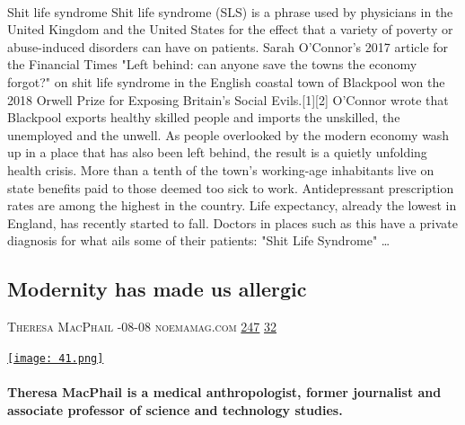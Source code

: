\documentclass[10pt,a4paper]{article}
\begin{document}
\begin{multicols}{2}
\paragraph{}
Shit life syndrome
Shit life syndrome (SLS) is a phrase used by physicians in the United Kingdom and the United States for the effect that a variety of poverty or abuse-induced disorders can have on patients.
Sarah O'Connor's 2017 article for the Financial Times "Left behind: can anyone save the towns the economy forgot?" on shit life syndrome in the English coastal town of Blackpool won the 2018 Orwell Prize for Exposing Britain's Social Evils.[1][2] O'Connor wrote that
Blackpool exports healthy skilled people and imports the unskilled, the unemployed and the unwell. As people overlooked by the modern economy wash up in a place that has also been left behind, the result is a quietly unfolding health crisis. More than a tenth of the town's working-age inhabitants live on state benefits paid to those deemed too sick to work. Antidepressant prescription rates are among the highest in the country. Life expectancy, already the lowest in England, has recently started to fall. Doctors in places such as this have a private diagnosis for what ails some of their patients: "Shit Life Syndrome"
\dots\par
\noindent\begin{minipage}{\linewidth}
\medskip
\subsection{Modernity has made us allergic}
\textsc{\footnotesize
{\scriptsize\faUser}\space 
Theresa MacPhail 
{\scriptsize\faCalendar}-08-08 
{\scriptsize\faGlobe}\space 
noemamag.com 
{\scriptsize\faThumbsOUp}\space 
\href{http://news.ycombinator.com/item?id=37195905\&utm\_term=comment}{247} 
{\scriptsize\faComments}\space 
\href{http://news.ycombinator.com/item?id=37195905\&utm\_term=comment}{32} 
}
\par\medskip\noindent
\href{https://www.noemamag.com/modernity-has-made-us-allergic/?utm\_source=hackernewsletter\&utm\_medium=email\&utm\_term=learn}{
    \texttt{[image: 41.png]}
}
\end{minipage}
\paragraph{}
\textbf{Theresa MacPhail is a medical anthropologist, former journalist and associate professor of science and technology studies.}

\end{multicols}
\end{document}
